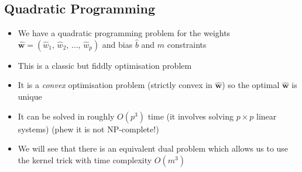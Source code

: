 \begin{slide}
\section{Quadratic Programming}

\begin{PauseHighLight}
  \begin{itemize}
  \item We have a quadratic programming problem for the weights
    $\hat{\bm{w}} = (\hat{w}_1,\,\hat{w}_2,\,\ldots,\,\hat{w}_p)$ and
    bias $\hat{b}$ and $m$ constraints\pause
  \item This is a classic but fiddly optimisation problem\pause
  \item It is a \emph{convex} optimisation problem (strictly convex
    in $\hat{\bm{w}}$) so the optimal $\hat{\bm{w}}$ is unique\pause
  \item It can be solved in roughly $O(p^3)$ time (it involves solving
    $p\times p$ linear systems)\pause{} (phew it is not NP-complete!)\pauseb
  \item We will see that there is an equivalent dual problem which
    allows us to use the kernel trick with time complexity $O(m^3)$\pause
  \end{itemize}
\end{PauseHighLight}

\end{slide}


\Outline %

